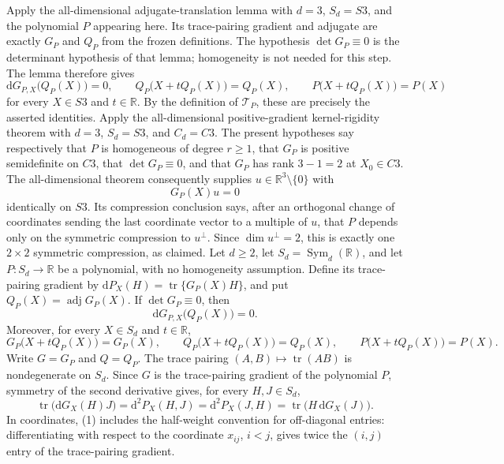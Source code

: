 Apply the all-dimensional adjugate-translation lemma with \(d=3\), \(S_d=S3\), and the polynomial \(P\) appearing here.  Its trace-pairing gradient and adjugate are exactly \(G_P\) and \(Q_P\) from the frozen definitions.  The hypothesis \(\det G_P\equiv0\) is the determinant hypothesis of that lemma; homogeneity is not needed for this step.  The lemma therefore gives
\[
 \mathrm dG_{P,X}\bigl(Q_P(X)\bigr)=0,
 \qquad
 Q_P\bigl(X+tQ_P(X)\bigr)=Q_P(X),
 \qquad
 P\bigl(X+tQ_P(X)\bigr)=P(X)
\]
for every \(X\in S3\) and \(t\in\mathbb R\).  By the definition of \(\mathcal T_P\), these are precisely the asserted identities.
Apply the all-dimensional positive-gradient kernel-rigidity theorem with \(d=3\), \(S_d=S3\), and \(C_d=C3\).  The present hypotheses say respectively that \(P\) is homogeneous of degree \(r\geq1\), that \(G_P\) is positive semidefinite on \(C3\), that \(\det G_P\equiv0\), and that \(G_P\) has rank \(3-1=2\) at \(X_0\in C3\).  The all-dimensional theorem consequently supplies \(u\in\mathbb R^3\setminus\{0\}\) with
\[
 G_P(X)u=0
\]
identically on \(S3\).  Its compression conclusion says, after an orthogonal change of coordinates sending the last coordinate vector to a multiple of \(u\), that \(P\) depends only on the symmetric compression to \(u^\perp\).  Since \(\dim u^\perp=2\), this is exactly one \(2\times2\) symmetric compression, as claimed.
Let \(d\geq2\), let \(S_d=\operatorname{Sym}_{d}(\mathbb R)\), and let \(P:S_d\to\mathbb R\) be a polynomial, with no homogeneity assumption.  Define its trace-pairing gradient by \(\mathrm dP_X(H)=\operatorname{tr}\{G_P(X)H\}\), and put \(Q_P(X)=\operatorname{adj}G_P(X)\).  If \(\det G_P\equiv0\), then
\[
 \mathrm dG_{P,X}\bigl(Q_P(X)\bigr)=0.
\]
Moreover, for every \(X\in S_d\) and \(t\in\mathbb R\),
\[
 G_P\bigl(X+tQ_P(X)\bigr)=G_P(X),\qquad
 Q_P\bigl(X+tQ_P(X)\bigr)=Q_P(X),\qquad
 P\bigl(X+tQ_P(X)\bigr)=P(X).
\]
Write \(G=G_P\) and \(Q=Q_P\).  The trace pairing \((A,B)\mapsto\operatorname{tr}(AB)\) is nondegenerate on \(S_d\).  Since \(G\) is the trace-pairing gradient of the polynomial \(P\), symmetry of the second derivative gives, for every \(H,J\in S_d\),
\[
 \operatorname{tr}\bigl(\mathrm dG_X(H)J\bigr)
 =\mathrm d^2P_X(H,J)
 =\mathrm d^2P_X(J,H)
 =\operatorname{tr}\bigl(H\,\mathrm dG_X(J)\bigr). \tag{1}
\]
In coordinates, (1) includes the half-weight convention for off-diagonal entries: differentiating with respect to the coordinate \(x_{ij}\), \(i<j\), gives twice the \((i,j)\) entry of the trace-pairing gradient.

